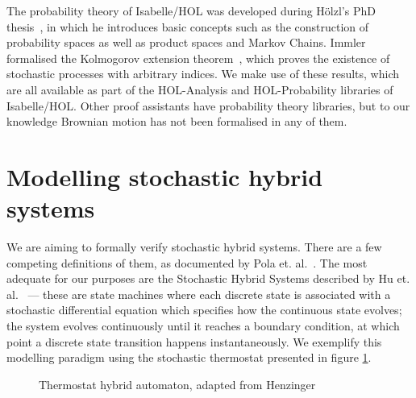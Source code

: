 \documentclass[orivec, envcountsame]{llncs}
\newcommand{\eq}{=} %
\begin{document}
The probability theory of Isabelle/HOL was developed during H{\"o}lzl's PhD thesis~\cite{holzlphd}, in which he introduces basic concepts such as the construction of probability spaces as well as product spaces and Markov Chains. Immler formalised the Kolmogorov extension theorem~\cite{immler12}, which proves the existence of stochastic processes with arbitrary indices. We make use of these results, which are all available as part of the HOL-Analysis and HOL-Probability libraries of Isabelle/HOL. Other proof assistants have probability theory libraries, but to our knowledge Brownian motion has not been formalised in any of them.

\section{Modelling stochastic hybrid systems}\label{sec:sim}
We are aiming to formally verify stochastic hybrid systems. There are a few competing definitions of them, as documented by Pola et. al.~\cite{pola03}. The most adequate for our purposes are the Stochastic Hybrid Systems described by Hu et. al.~\cite{hu00} --- these are state machines where each discrete state is associated with a stochastic differential equation which specifies how the continuous state evolves; the system evolves continuously until it reaches a boundary condition, at which point a discrete state transition happens instantaneously. We exemplify this modelling paradigm using the stochastic thermostat presented in figure \ref{fig:thermostat}.

\begin{figure}
\begin{center}
\caption{Thermostat hybrid automaton, adapted from Henzinger~\cite{henzinger00}}\label{fig:thermostat}
\end{center}
\end{figure}
\end{document}
